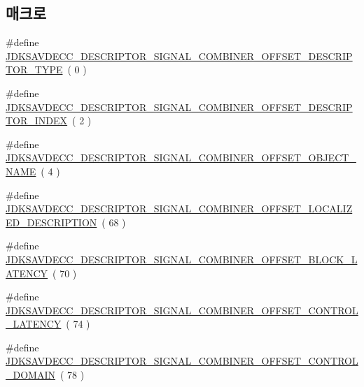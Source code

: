 \subsection*{매크로}
\begin{DoxyCompactItemize}
\item 
\#define \hyperlink{group__descriptor__signal__combiner_ga6e14db55997039e74a1c9496cf8e6764}{J\+D\+K\+S\+A\+V\+D\+E\+C\+C\+\_\+\+D\+E\+S\+C\+R\+I\+P\+T\+O\+R\+\_\+\+S\+I\+G\+N\+A\+L\+\_\+\+C\+O\+M\+B\+I\+N\+E\+R\+\_\+\+O\+F\+F\+S\+E\+T\+\_\+\+D\+E\+S\+C\+R\+I\+P\+T\+O\+R\+\_\+\+T\+Y\+PE}~( 0 )
\item 
\#define \hyperlink{group__descriptor__signal__combiner_gab43bd07c7df8a0516928c575404334a4}{J\+D\+K\+S\+A\+V\+D\+E\+C\+C\+\_\+\+D\+E\+S\+C\+R\+I\+P\+T\+O\+R\+\_\+\+S\+I\+G\+N\+A\+L\+\_\+\+C\+O\+M\+B\+I\+N\+E\+R\+\_\+\+O\+F\+F\+S\+E\+T\+\_\+\+D\+E\+S\+C\+R\+I\+P\+T\+O\+R\+\_\+\+I\+N\+D\+EX}~( 2 )
\item 
\#define \hyperlink{group__descriptor__signal__combiner_gaae7f23ed6121c6a4434a8b87f8e079e4}{J\+D\+K\+S\+A\+V\+D\+E\+C\+C\+\_\+\+D\+E\+S\+C\+R\+I\+P\+T\+O\+R\+\_\+\+S\+I\+G\+N\+A\+L\+\_\+\+C\+O\+M\+B\+I\+N\+E\+R\+\_\+\+O\+F\+F\+S\+E\+T\+\_\+\+O\+B\+J\+E\+C\+T\+\_\+\+N\+A\+ME}~( 4 )
\item 
\#define \hyperlink{group__descriptor__signal__combiner_ga67b074b2d5bbc4985848046f141ce35b}{J\+D\+K\+S\+A\+V\+D\+E\+C\+C\+\_\+\+D\+E\+S\+C\+R\+I\+P\+T\+O\+R\+\_\+\+S\+I\+G\+N\+A\+L\+\_\+\+C\+O\+M\+B\+I\+N\+E\+R\+\_\+\+O\+F\+F\+S\+E\+T\+\_\+\+L\+O\+C\+A\+L\+I\+Z\+E\+D\+\_\+\+D\+E\+S\+C\+R\+I\+P\+T\+I\+ON}~( 68 )
\item 
\#define \hyperlink{group__descriptor__signal__combiner_ga01fe6f39a2fde1cbc6c22ddf067109ea}{J\+D\+K\+S\+A\+V\+D\+E\+C\+C\+\_\+\+D\+E\+S\+C\+R\+I\+P\+T\+O\+R\+\_\+\+S\+I\+G\+N\+A\+L\+\_\+\+C\+O\+M\+B\+I\+N\+E\+R\+\_\+\+O\+F\+F\+S\+E\+T\+\_\+\+B\+L\+O\+C\+K\+\_\+\+L\+A\+T\+E\+N\+CY}~( 70 )
\item 
\#define \hyperlink{group__descriptor__signal__combiner_ga4965252f917ceb2f8c846b6b1ea8d307}{J\+D\+K\+S\+A\+V\+D\+E\+C\+C\+\_\+\+D\+E\+S\+C\+R\+I\+P\+T\+O\+R\+\_\+\+S\+I\+G\+N\+A\+L\+\_\+\+C\+O\+M\+B\+I\+N\+E\+R\+\_\+\+O\+F\+F\+S\+E\+T\+\_\+\+C\+O\+N\+T\+R\+O\+L\+\_\+\+L\+A\+T\+E\+N\+CY}~( 74 )
\item 
\#define \hyperlink{group__descriptor__signal__combiner_ga63adba044bf7fafd5c82510ced61a64c}{J\+D\+K\+S\+A\+V\+D\+E\+C\+C\+\_\+\+D\+E\+S\+C\+R\+I\+P\+T\+O\+R\+\_\+\+S\+I\+G\+N\+A\+L\+\_\+\+C\+O\+M\+B\+I\+N\+E\+R\+\_\+\+O\+F\+F\+S\+E\+T\+\_\+\+C\+O\+N\+T\+R\+O\+L\+\_\+\+D\+O\+M\+A\+IN}~( 78 )

\end{DoxyCompactItemize}
